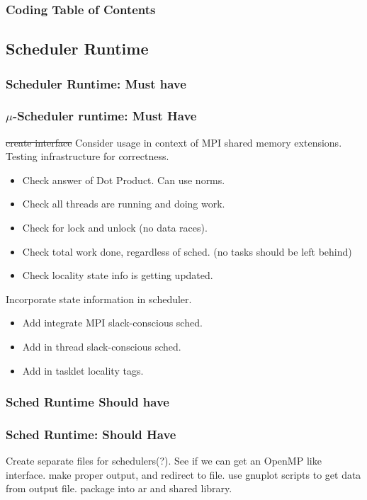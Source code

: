 \begin{frame}
\frametitle{Coding Table of Contents}
\tableofcontents[part=1]
\end{frame} 

\subsection{Scheduler Runtime}
\subsubsection{Scheduler Runtime: Must have} 
\begin{frame}
\frametitle{$\mu$-Scheduler runtime: Must Have}
\begin{enumerate} 
\bllt \sout{create interface}
\bllt Consider usage in context of MPI shared memory extensions.
\bllt Testing infrastructure for correctness. 
\begin{itemize} 
\item \tiny Check answer of Dot Product. Can use norms. 
\item \tiny Check all threads are running and doing work. 
\item \tiny Check for lock and unlock (no data races). 
\item \tiny Check total work done, regardless of sched. (no tasks should be left behind) 
\item \tiny Check locality state info is getting updated. 
\end{itemize}
\bllt Incorporate state information in scheduler. 
\begin{itemize}
\item \tiny Add integrate MPI slack-conscious sched. 
\item \tiny Add in thread slack-conscious sched. 
\item \tiny Add in tasklet locality tags. 
\end{itemize}
\end{enumerate} 
\end{frame} 

\subsubsection{Sched Runtime Should have}
\begin{frame}
\frametitle{Sched Runtime: Should Have}
\begin{enumerate} 
\bllt Create separate files for schedulers(?). 
\bllt See if we can get an OpenMP like interface. 
\bllt make proper output, and redirect to file. 
\bllt use gnuplot scripts to get data from output file. 
\bllt package into ar and shared library. 
\end{enumerate}
\end{frame}


